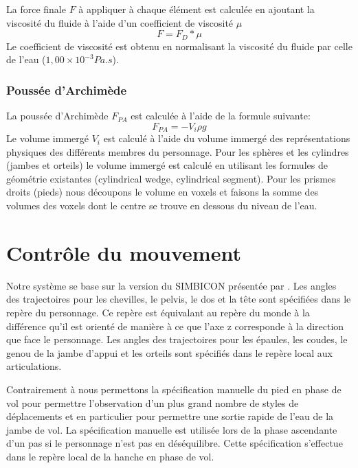 \documentclass[runningheads,a4paper]{llncs}
\begin{document}
La force finale $F$ à appliquer à chaque élément est calculée en ajoutant la viscosité du fluide à l'aide d'un coefficient de viscosité $\mu$ 
\[
F=F_D*\mu
\]
Le coefficient de viscosité est obtenu en normalisant la viscosité du fluide par celle de l'eau ($1,00 \times 10^{-3} Pa.s$).
%
\subsubsection{Poussée d'Archimède}
%
La poussée d'Archimède $F_{PA}$ est calculée à l'aide de la formule suivante:
\[
F_{PA}=-V_i \rho g
\]
Le volume immergé \(V_i\) est calculé à l'aide du volume immergé des représentations physiques des différents membres du personnage.  Pour les sphères et les cylindres (jambes et orteils) le volume immergé est calculé en utilisant les formules de géométrie existantes (cylindrical wedge, cylindrical segment). Pour les prismes droits (pieds) nous découpons le volume en voxels et faisons la somme des volumes des voxels dont le centre se trouve en dessous du niveau de l'eau.
%
\section{Contrôle du mouvement}
\label{sec:controler}
%
Notre système se base sur la version du SIMBICON présentée par \cite{coros2010generalized}. Les angles des trajectoires pour les chevilles, le pelvis, le dos et la tête sont spécifiées dans le repère du personnage. Ce repère est équivalant au repère du monde à la différence qu'il est orienté de manière à ce que l'axe z corresponde à la direction que face le personnage. Les angles des trajectoires pour les épaules, les coudes, le genou de la jambe d'appui et les orteils sont spécifiés dans le repère local aux articulations.

Contrairement à \cite{coros2010generalized} nous permettons la spécification manuelle du pied en phase de vol pour permettre l'observation d'un plus grand nombre de styles de déplacements et en particulier pour permettre une sortie rapide de l'eau de la jambe de vol. La spécification manuelle est utilisée lors de la phase ascendante d'un pas si le personnage n'est pas en déséquilibre. Cette spécification s'effectue dans le repère local de la hanche en phase de vol.

%
\end{document}
